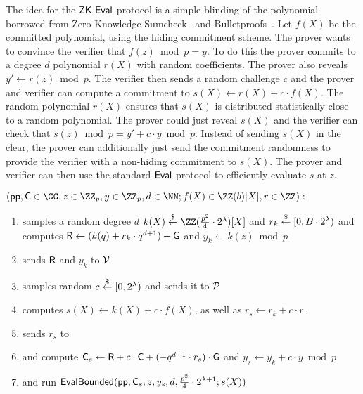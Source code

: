 The idea for the $\textsf{{ZK-Eval}}$ protocol is a simple blinding of the polynomial borrowed from Zero-Knowledge Sumcheck~\cite{EPRINT:ChiForSpo17} and Bulletproofs~\cite{EC:BCCGP16,SP:BBBPWM18}. Let $f(X)$ be the committed polynomial, using the hiding commitment scheme. The prover wants to convince the verifier that $f(z)\bmod p=y$. To do this the prover commits to a degree $d$ polynomial $r(X)$ with random coefficients. The prover also reveals $y'\gets r(z)\bmod p$. The verifier then sends a random challenge $c$ and the prover and verifier can compute a commitment to $s(X)\gets r(X)+c\cdot f(X)$. The random polynomial $r(X)$ ensures that $s(X)$ is distributed statistically close to a random polynomial. The prover could just reveal $s(X)$ and the verifier can check that $s(z)\bmod p=y'+c \cdot y\bmod p$. Instead of sending $s(X)$ in the clear, the prover can additionally just send the commitment randomness to provide the verifier with a non-hiding commitment to $s(X)$. The prover and verifier can then use the standard $\textsf{{Eval}}$ protocol to efficiently evaluate $s$ at $z$.
 \noindent\begin{mdframed}[userdefinedwidth=\textwidth]
\begin{minipage}{\textwidth}
	\begin{flushleft}
	$(\params, \gr{C} \in \GG, z \in \ZZ_p, y \in \ZZ_p, d \in \NN; f(X) \in \ZZ(b)[X], r \in \ZZ):$\\
	\begin{enumerate}[nolistsep]
		    \item \prover samples a random degree $d$ $k(X) \sample \ZZ(\frac{p^2}{4}\cdot 2^\lambda)[X]$ and $r_k \overset{\$}{\gets} [0,B\cdot 2^\lambda)$ and computes $\gr{R} \gets (k(q) + r_k \cdot q^{d+1})+\gr{g}$ and $y_k \gets k(z) \bmod p$
		    \item \prover sends $\gr{R}$ and $y_k$ to $\mathcal{V}$
		    \item \verifier samples random $c\overset{\$}{\gets} [0,2^\lambda)$ and sends it to $\mathcal{P}$
		    \item \prover computes $s(X)\gets k(X) + c \cdot f(X)$, as well as $r_s \gets r_k + c\cdot r$.
		    \item \prover sends $r_s$ to \verifier
		    \item \prover and \verifier compute $\gr{C}_s\gets \gr{R} + c\cdot \gr{C} +(-q^{d+1}\cdot r_s)\cdot \gr{g}$ and $y_s\gets y_k+c \cdot y \bmod p$ 
		    \item \prover and \verifier run $\pro{EvalBounded}(\crs,\gr{C}_s,z,y_s,d,\frac{p^2}{4}\cdot 2^{\lambda+1};s(X))$ 
		   		\end{enumerate}
	\end{flushleft}
\end{minipage}
\end{mdframed}

